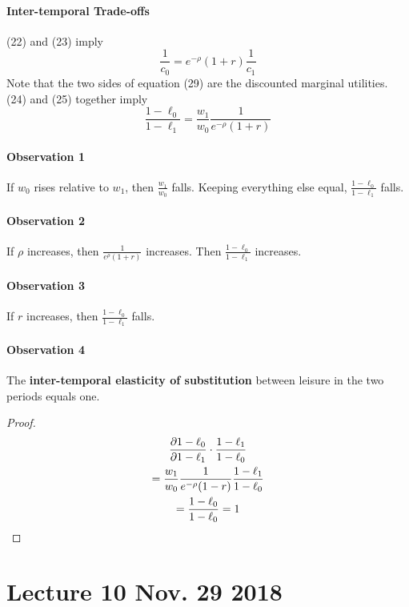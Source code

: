 \documentclass[11pt]{article}
\begin{document}
					\paragraph{Inter-temporal Trade-offs}
						(22) and (23) imply
						\begin{equation}
							\frac{1}{c_0} = e^{-\rho}(1+r)\frac{1}{c_1}
						\end{equation}
						Note that the two sides of equation (29) are the discounted marginal utilities.
						(24) and (25) together imply
						\begin{equation}
							\frac{1-\ell_0}{1-\ell_1} = \frac{w_1}{w_0}\frac{1}{e^{-\rho}(1+r)}
						\end{equation}
					\paragraph{Observation 1} If $w_0$ rises relative to $w_1$, then $\frac{w_1}{w_0}$ falls. Keeping everything else equal, $\frac{1-\ell_0}{1-\ell_1}$ falls.
					\paragraph{Observation 2} If $\rho$ increases, then $\frac{1}{e^{\rho}(1+r)}$ increases. Then $\frac{1-\ell_0}{1-\ell_1}$ increases.
					\paragraph{Observation 3} If $r$ increases, then $\frac{1-\ell_0}{1-\ell_1}$ falls.
					\paragraph{Observation 4} The \textbf{inter-temporal  elasticity of substitution} between leisure in the two periods equals one.
					\begin{proof}
						\begin{gather*}
							\frac{\partial{1-\ell_0}}{\partial{1-\ell_1}} \cdot \frac{1-\ell_1}{1-\ell_0} \\
							= \frac{w_1}{w_0} \frac{1}{e^{-\rho}(1-r)} \frac{1-\ell_1}{1-\ell_0} \\
							= \frac{1-\ell_0}{1-\ell_0} = 1
						\end{gather*}
					\end{proof}
	\section{Lecture 10 Nov. 29 2018}
\end{document}

